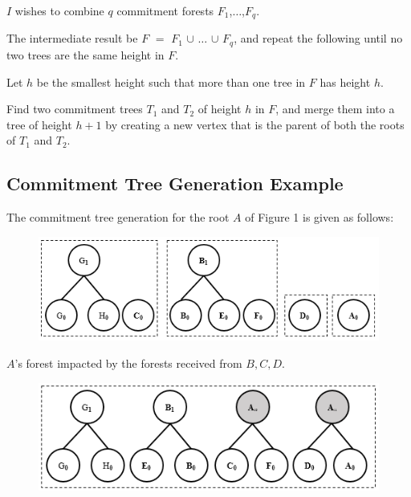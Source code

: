 \documentclass[%
  slidesonly,%
  semlayer%
  ]{seminar}                                  %
\begin{document}
\begin{slide}
      $I$ wishes to combine $q$ commitment forests $F_{1}$,$\dotsc$,$F_{q}$.
      
      The intermediate result be $F$ $=$ $F_{1}$ $\cup$ $\dotsc$ $\cup$ $F_{q}$, and repeat the following until no two trees are the same height in $F$.
      
      Let $h$ be the smallest height such that more than one tree in $F$ has height $h$.
      
      Find two commitment trees $T_{1}$ and $T_{2}$ of height $h$ in $F$, and merge them into a tree of height $h + 1$ by creating a new 
      vertex that is the parent of both the roots of $T_{1}$ and $T_{2}$.
      \vfill
      \clearpage
    \subsection*{Commitment Tree Generation Example}
      \vfill
      The commitment tree generation for the root $A$ of Figure 1 is given as follows:
      \begin{figure}
        \centering
        \includegraphics[scale = 0.4]{images/a-forest-shia.png}
      \end{figure}
      \begin{tiny}
      \begin{center}
        $A$'s forest impacted by the forests received from $B, C, D$.
      \end{center}
      \end{tiny}
      \begin{figure}
        \centering
        \includegraphics[scale = 0.4]{images/a-forest-first-merge-shia.png}
      \end{figure}

\end{slide}
\end{document}
